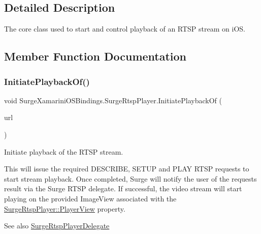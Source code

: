 \subsection{Detailed Description}
The core class used to start and control playback of an R\+T\+SP stream on i\+OS. 



\subsection{Member Function Documentation}
\mbox{\label{interface_surge_xamarini_o_s_bindings_1_1_surge_rtsp_player_a7c2572b559c1758415a21c0bde4417be}} 
\subsubsection{\texorpdfstring{Initiate\+Playback\+Of()}{InitiatePlaybackOf()}\hspace{0.1cm}{\footnotesize\ttfamily [1/3]}}
{\footnotesize\ttfamily void Surge\+Xamarini\+O\+S\+Bindings.\+Surge\+Rtsp\+Player.\+Initiate\+Playback\+Of (\begin{DoxyParamCaption}\item[{N\+S\+Url}]{url }\end{DoxyParamCaption})}



Initiate playback of the R\+T\+SP stream. 

This will issue the required D\+E\+S\+C\+R\+I\+BE, S\+E\+T\+UP and P\+L\+AY R\+T\+SP requests to start stream playback. Once completed, Surge will notify the user of the requests result via the Surge R\+T\+SP delegate. If successful, the video stream will start playing on the provided Image\+View associated with the \hyperlink{interface_surge_xamarini_o_s_bindings_1_1_surge_rtsp_player_ab629f9303d6b427a8213e1dee03a3810}{Surge\+Rtsp\+Player\+::\+Player\+View} property.

\begin{DoxySeeAlso}{See also}
\hyperlink{interface_surge_xamarini_o_s_bindings_1_1_surge_rtsp_player_delegate}{Surge\+Rtsp\+Player\+Delegate} 
\end{DoxySeeAlso}



